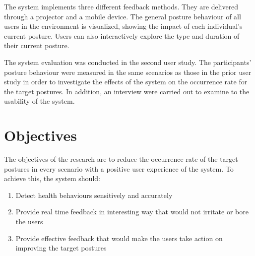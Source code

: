 The system implements three different feedback methods. They are delivered through a projector and a mobile device. The general posture behaviour of all users in the environment is visualized, showing the impact of each individual's current posture. Users can also interactively explore the type and duration of their current posture.

The system evaluation was conducted in the second user study. The participants' posture behaviour were measured in the same scenarios as those in the prior user study in order to investigate the effects of the system on the occurrence rate for the target postures. In addition, an interview were carried out to examine to the usability of the system.

\section{Objectives}
The objectives of the research are to reduce the occurrence rate of the target postures in every scenario with a positive user experience of the system. To achieve this, the system should:

\begin{enumerate}
  \item Detect health behaviours sensitively and accurately
  \item Provide real time feedback in interesting way that would not irritate or bore the users
  \item Provide effective feedback that would make the users take action on improving the target postures
\end{enumerate}
